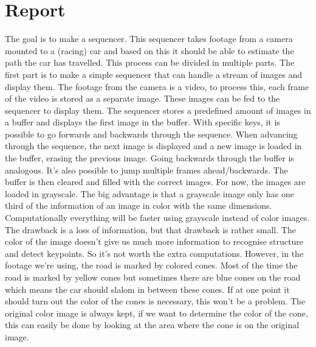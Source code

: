 \chapter{Report}

The goal is to make a sequencer. This sequencer takes footage from a camera mounted to a (racing) car and based on this it should be able to estimate the path the car has travelled. This process can be divided in multiple parts. The first part is to make a simple sequencer that can handle a stream of images and display them. The footage from the camera is a video, to process this, each frame of the video is stored as a separate image. These images can be fed to the sequencer to display them. The sequencer stores a predefined amount of images in a buffer and displays the first image in the buffer. With specific keys, it is possible to go forwards and backwards through the sequence. When advancing through the sequence, the next image is displayed and a new image is loaded in the buffer, erasing the previous image. Going backwards through the buffer is analogous. It's also possible to jump multiple frames ahead/backwards. The buffer is then cleared and filled with the correct images. For now, the images are loaded in grayscale. The big advantage is that a grayscale image only has one third of the information of an image in color with the same dimensions. Computationally everything will be faster using grayscale instead of color images. The drawback is a loss of information, but that drawback is rather small. The color of the image doesn't give us much more information to recognise structure and detect keypoints. So it's not worth the extra computations. However, in the footage we're using, the road is marked by colored cones. Most of the time the road is marked by yellow cones but sometimes there are blue cones on the road which means the car should slalom in between these cones. If at one point it should turn out the color of the cones is necessary, this won't be a problem. The original color image is always kept, if we want to determine the color of the cone, this can easily be done by looking at the area where the cone is on the original image.

